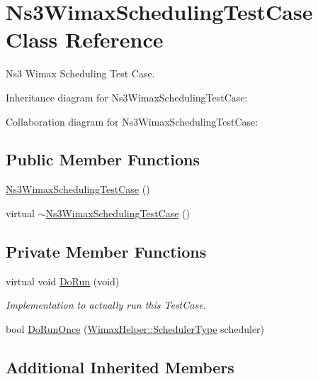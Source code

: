 \hypertarget{classNs3WimaxSchedulingTestCase}{}\section{Ns3\+Wimax\+Scheduling\+Test\+Case Class Reference}
\label{classNs3WimaxSchedulingTestCase}


Ns3 Wimax Scheduling Test Case.  




Inheritance diagram for Ns3\+Wimax\+Scheduling\+Test\+Case\+:


Collaboration diagram for Ns3\+Wimax\+Scheduling\+Test\+Case\+:
\subsection*{Public Member Functions}
\begin{DoxyCompactItemize}
\item 
\hyperlink{classNs3WimaxSchedulingTestCase_a7d5b5436caae1ab43cd0ee53c8030131}{Ns3\+Wimax\+Scheduling\+Test\+Case} ()
\item 
virtual \hyperlink{classNs3WimaxSchedulingTestCase_a9c641c3f72b89f962c1dc161be8c1ad1}{$\sim$\+Ns3\+Wimax\+Scheduling\+Test\+Case} ()
\end{DoxyCompactItemize}
\subsection*{Private Member Functions}
\begin{DoxyCompactItemize}
\item 
virtual void \hyperlink{classNs3WimaxSchedulingTestCase_a4fa22645a5d9c5b1fdde467b522d3d26}{Do\+Run} (void)
\begin{DoxyCompactList}\small\item\em Implementation to actually run this Test\+Case. \end{DoxyCompactList}\item 
bool \hyperlink{classNs3WimaxSchedulingTestCase_aad78c43ab4763cf03d3da38910f84977}{Do\+Run\+Once} (\hyperlink{classns3_1_1WimaxHelper_a27a40a8f601900126156781c2ca79406}{Wimax\+Helper\+::\+Scheduler\+Type} scheduler)
\end{DoxyCompactItemize}
\subsection*{Additional Inherited Members}


